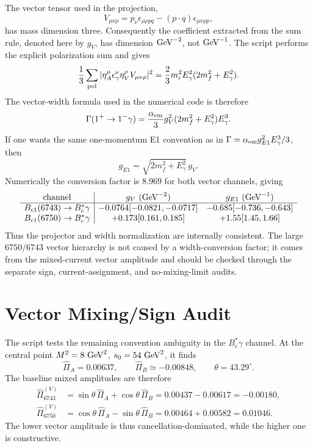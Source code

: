 \documentclass[11pt]{article}
\newcommand{\Bcst}{B_c^\ast}
\newcommand{\BcOne}{B_{c1}}
\begin{document}
The vector tensor used in the projection,
\[
V_{\mu\nu\rho}
=p_\nu\epsilon_{\mu\rho pq}
-(p\cdot q)\epsilon_{\mu\nu\rho p},
\]
has mass dimension three.  Consequently the coefficient extracted from the
sum rule, denoted here by \(g_V\), has dimension \({\rm GeV}^{-2}\), not
\({\rm GeV}^{-1}\).  The script
 performs the explicit polarization
sum and gives
\[
\frac{1}{3}\sum_{\rm pol}
|\eta_A^\mu\epsilon_\gamma^\nu\eta_V^\rho V_{\mu\nu\rho}|^2
=
\frac{2}{3}m_i^2E_\gamma^2(2m_f^2+E_\gamma^2).
\]
The vector-width formula used in the numerical code is therefore
\[
\Gamma(1^+\to1^-\gamma)
=
\frac{\alpha_{\rm em}}{3}g_V^2(2m_f^2+E_\gamma^2)E_\gamma^3.
\]
If one wants the same one-momentum E1 convention as in
\(\Gamma=\alpha_{\rm em}g_{E1}^2E_\gamma^3/3\), then
\[
g_{E1}=\sqrt{2m_f^2+E_\gamma^2}\,g_V.
\]
Numerically the conversion factor is \(8.969\) for both vector channels, giving
\[
\begin{array}{c|cc}
\text{channel} & g_V~({\rm GeV}^{-2}) & g_{E1}~({\rm GeV}^{-1})\\
\hline
\BcOne(6743)\to\Bcst\gamma
& -0.0764[-0.0821,-0.0717] & -0.685[-0.736,-0.643]\\
\BcOne(6750)\to\Bcst\gamma
& +0.173[0.161,0.185] & +1.55[1.45,1.66]
\end{array}
\]
Thus the projector and width normalization are internally consistent.  The
large \(6750/6743\) vector hierarchy is not caused by a width-conversion factor;
it comes from the mixed-current vector amplitude and should be checked through
the separate sign, current-assignment, and no-mixing-limit audits.

\section{Vector Mixing/Sign Audit}

The script  tests the remaining convention
ambiguity in the \(B_c^\ast\gamma\) channel.  At the central point
\(M^2=8~{\rm GeV}^2\), \(s_0=54~{\rm GeV}^2\), it finds
\[
\widehat\Pi_A=0.00637,\qquad \widehat\Pi_B\simeq -0.00848,
\qquad \theta=43.29^\circ .
\]
The baseline mixed amplitudes are therefore
\[
\begin{aligned}
\widehat\Pi_{6743}^{(V)}
&=\sin\theta\,\widehat\Pi_A+\cos\theta\,\widehat\Pi_B
=0.00437-0.00617=-0.00180,\\
\widehat\Pi_{6750}^{(V)}
&=\cos\theta\,\widehat\Pi_A-\sin\theta\,\widehat\Pi_B
=0.00464+0.00582=0.01046 .
\end{aligned}
\]
The lower vector amplitude is thus cancellation-dominated, while the higher
one is constructive.
\end{document}
